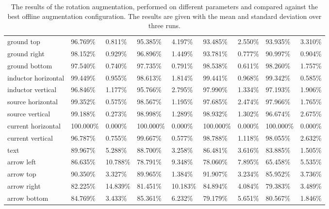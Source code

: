 \begin{table}[H]
\begin{center}
\begin{tabular}{|l|l|l|l|l|l|l|l|l|}
ground top                      & 96.769\%  & 0.811\%  & 95.385\%  & 4.197\%  & 93.485\%  & 2.550\% & 93.935\%  & 3.310\%   \\
\rowcolor{lightgray!50}
ground right                    & 98.152\%  & 0.929\%  & 96.896\%  & 1.449\%  & 93.781\%  & 0.777\% & 90.997\%  & 0.904\%   \\
ground bottom                   & 97.540\%  & 0.740\%  & 97.735\%  & 0.791\%  & 98.538\%  & 0.611\% & 98.260\%  & 1.757\%   \\
\rowcolor{lightgray!50}
inductor horizontal             & 99.449\%  & 0.955\%  & 98.613\%  & 1.814\%  & 99.441\%  & 0.968\% & 99.342\%  & 0.585\%   \\
inductor vertical               & 96.846\%  & 1.177\%  & 95.766\%  & 2.795\%  & 97.990\%  & 1.334\% & 97.193\%  & 1.906\%   \\
\rowcolor{lightgray!50}
source horizontal               & 99.352\%  & 0.575\%  & 98.567\%  & 1.195\%  & 97.685\%  & 2.474\% & 97.966\%  & 1.765\%   \\
source vertical                 & 99.188\%  & 0.273\%  & 98.998\%  & 1.289\%  & 98.932\%  & 1.302\% & 96.674\%  & 2.675\%   \\
\rowcolor{lightgray!50}
current horizontal              & 100.000\% & 0.000\%  & 100.000\% & 0.000\%  & 100.000\% & 0.000\% & 100.000\% & 0.000\%   \\
current vertical                & 96.787\%  & 0.755\%  & 99.667\%  & 0.577\%  & 98.788\%  & 1.118\% & 98.055\%  & 2.632\%   \\
\rowcolor{lightgray!50}
text                            & 89.967\%  & 5.288\%  & 88.700\%  & 3.258\%  & 86.481\%  & 3.616\% & 83.885\%  & 1.505\%   \\
arrow left                      & 86.635\%  & 10.788\% & 78.791\%  & 9.348\%  & 78.060\%  & 7.895\% & 65.458\%  & 5.535\%   \\
\rowcolor{lightgray!50}
arrow top                       & 90.350\%  & 3.327\%  & 89.965\%  & 1.384\%  & 91.907\%  & 3.234\% & 85.952\%  & 3.736\%   \\
arrow right                     & 82.225\%  & 14.839\% & 81.451\%  & 10.183\% & 84.894\%  & 4.084\% & 79.383\%  & 3.489\%   \\
\rowcolor{lightgray!50}
arrow bottom                    & 84.769\%  & 3.433\%  & 85.361\%  & 6.232\%  & 79.179\%  & 5.651\% & 80.567\%  & 1.846\%   \\
\hline

\end{tabular}
\caption{The results of the rotation augmentation, performed on different parameters and compared against the best offline augmentation configuration. The results are given with the mean and standard deviation over three runs.}
\label{tab:yolo_rotation_augmentation_result}
\end{center}
\end{table}

